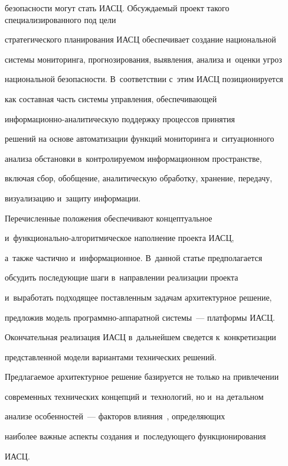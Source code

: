 безопасности могут стать ИАСЦ. Об\-суж\-да\-емый проект такого специализированного под цели 


стратегического планирования ИАСЦ обеспечивает создание национальной 


сис\-те\-мы мониторинга, прогнозирования, выявления, анализа и~оценки угроз 


национальной безопас\-ности. В~соответствии с~этим ИАСЦ позиционируется 


как составная часть системы управления, обеспечивающей  


ин\-фор\-ма\-ци\-он\-но-ана\-ли\-ти\-че\-скую поддержку процессов принятия 


решений на основе автоматизации функций мониторинга и~ситуационного 


анализа обстановки в~контролируемом информационном пространстве, 


включая сбор, обобщение, аналитическую обработку, хранение, передачу, 


визуа\-лизацию и~защиту информации.





Перечисленные положения обеспечивают концептуальное  


и~функциональ\-но-ал\-го\-рит\-ми\-че\-ское наполнение проекта ИАСЦ, 


а~также частично и~информационное. В~данной статье предполагается 


обсудить последующие шаги в~направлении реализации проекта 


и~выработать подходящее поставленным задачам архитектурное решение, 


предложив модель программно-аппаратной системы~--- платформы ИАСЦ. 


Окончательная реализация ИАСЦ в~дальнейшем сведется к~конкретизации 


представленной модели вариантами технических решений.





Предлагаемое архитектурное решение базируется не только на привлечении 


современных технических концепций и~технологий, но и~на детальном 


анализе особенностей~--- факторов влияния~\cite{5-bs}, определяющих 


наиболее важные аспекты создания и~последующего функционирования 


ИАСЦ.





